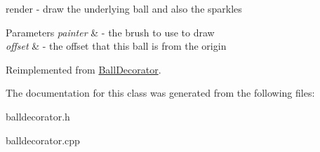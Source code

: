 render -\/ draw the underlying ball and also the sparkles 


\begin{DoxyParams}{Parameters}
{\em painter} & -\/ the brush to use to draw \\
\hline
{\em offset} & -\/ the offset that this ball is from the origin \\
\hline
\end{DoxyParams}


Reimplemented from \mbox{\hyperlink{class_ball_decorator_af8205f8033b2490ecd3365c24ff5cdeb}{Ball\+Decorator}}.



The documentation for this class was generated from the following files\+:\begin{DoxyCompactItemize}
\item 
balldecorator.\+h\item 
balldecorator.\+cpp\end{DoxyCompactItemize}
